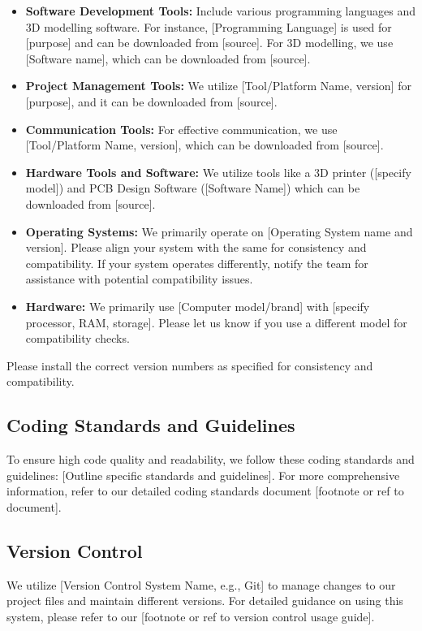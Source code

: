 \documentclass[10pt]{projectdoc}
\begin{document}
\begin{itemize}
\item \textbf{Software Development Tools:} Include various programming languages and 3D modelling software. For instance, [Programming Language] is used for [purpose] and can be downloaded from [source]. For 3D modelling, we use [Software name], which can be downloaded from [source].
\item \textbf{Project Management Tools:} We utilize [Tool/Platform Name, version] for [purpose], and it can be downloaded from [source].
\item \textbf{Communication Tools:} For effective communication, we use [Tool/Platform Name, version], which can be downloaded from [source].
\item \textbf{Hardware Tools and Software:} We utilize tools like a 3D printer ([specify model]) and PCB Design Software ([Software Name]) which can be downloaded from [source].
\item \textbf{Operating Systems:} We primarily operate on [Operating System name and version]. Please align your system with the same for consistency and compatibility. If your system operates differently, notify the team for assistance with potential compatibility issues.
\item \textbf{Hardware:} We primarily use [Computer model/brand] with [specify processor, RAM, storage]. Please let us know if you use a different model for compatibility checks.
\end{itemize}

Please install the correct version numbers as specified for consistency and compatibility.

\subsection{Coding Standards and Guidelines}

To ensure high code quality and readability, we follow these coding standards and guidelines: [Outline specific standards and guidelines]. For more comprehensive information, refer to our detailed coding standards document [footnote or ref to document].

\subsection{Version Control}

We utilize [Version Control System Name, e.g., Git] to manage changes to our project files and maintain different versions. For detailed guidance on using this system, please refer to our [footnote or ref to version control usage guide].
\end{document}
